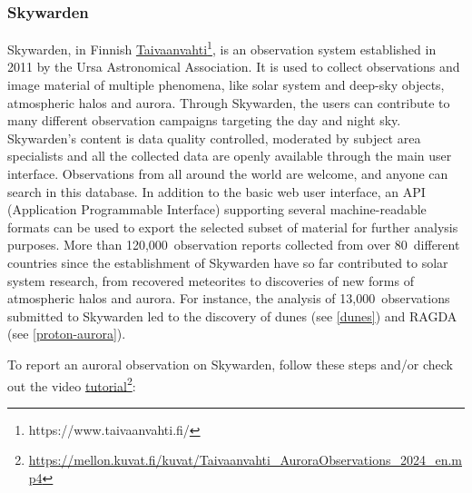\documentclass{article}
\newcommand{\contributed}[1]{%
    \par\noindent
    \begingroup
    \setlength{\leftskip}{1em}%
    \itshape
    Contributors: #1
    \par
    \endgroup
    \vspace{0.5em}
}
\begin{document}
\subsubsection{Skywarden}\label{skywarden}
Skywarden, in Finnish \href{https://www.taivaanvahti.fi/}{Taivaanvahti}\footnote{https://www.taivaanvahti.fi/}, is an observation system established in 2011 by the Ursa Astronomical Association. It is used to collect observations and image material of multiple phenomena, like solar system and deep-sky objects, atmospheric halos and aurora. Through Skywarden, the users can contribute to many different observation campaigns targeting the day and night sky. Skywarden's content is data quality controlled, moderated by subject area specialists and all the collected data are openly available through the main user interface. Observations from all around the world are welcome, and anyone can search in this database. In addition to the basic web user interface, an API (Application Programmable Interface) supporting several machine-readable formats can be used to export the selected subset of material for further analysis purposes. More than 120,000~observation reports collected from over 80~different countries since the establishment of Skywarden have so far contributed to solar system research, from recovered meteorites to discoveries of new forms of atmospheric halos and aurora. For instance, the analysis of 13,000~observations submitted to Skywarden led to the discovery of dunes (see \ref{dunes}) and RAGDA (see \ref{proton-aurora}). 

To report an auroral observation on Skywarden, follow these steps and/or check out the video
\href{https://mellon.kuvat.fi/kuvat/Taivaanvahti_AuroraObservations_2024_en.mp4}{tutorial}\footnote{\url{https://mellon.kuvat.fi/kuvat/Taivaanvahti_AuroraObservations_2024_en.mp4}}:
\end{document}
